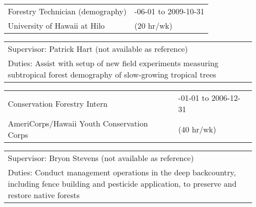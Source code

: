 \documentclass[10pt,english]{article}
\providecommand{\tabularnewline}{\\}
\begin{document}
\renewcommand{\arraystretch}{1.2}
\begin{tabularx}{\textwidth}{@{}>{\raggedright}p{4.5in} >{\raggedleft}X@{}}
Forestry Technician (demography) & 2009-06-01 to 2009-10-31 \tabularnewline
University of Hawaii at Hilo & (20 hr/wk) \tabularnewline
\end{tabularx}

\renewcommand{\arraystretch}{1.2}
\begin{tabularx}{\textwidth}{@{}>{\raggedright}p{6.25in} >{\raggedleft}X@{}}
\addtolength{\leftskip}{5ex}Supervisor: Patrick Hart (not available as reference) \tabularnewline
\addtolength{\leftskip}{5ex}Duties: Assist with setup of new field experiments measuring subtropical forest demography of slow-growing tropical trees \tabularnewline
\end{tabularx}

\renewcommand{\arraystretch}{1.2}
\begin{tabularx}{\textwidth}{@{}>{\raggedright}p{4.5in} >{\raggedleft}X@{}}
Conservation Forestry Intern & 2006-01-01 to 2006-12-31 \tabularnewline
AmeriCorps/Hawaii Youth Conservation Corps & (40 hr/wk) \tabularnewline
\end{tabularx}

\renewcommand{\arraystretch}{1.2}
\begin{tabularx}{\textwidth}{@{}>{\raggedright}p{6.25in} >{\raggedleft}X@{}}
\addtolength{\leftskip}{5ex}Supervisor: Bryon Stevens (not available as reference) \tabularnewline
\addtolength{\leftskip}{5ex}Duties: Conduct management operations in the deep backcountry, including fence building and pesticide application, to preserve and restore native forests \tabularnewline
\end{tabularx}

\vspace{1ex}

%
%
\end{document}
